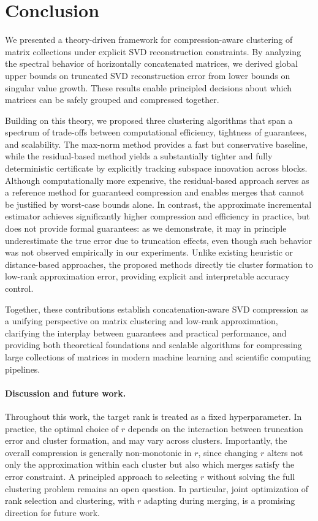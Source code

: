 \documentclass[10pt]{article} %
\begin{document}
\section{Conclusion}

We presented a theory-driven framework for compression-aware clustering of matrix collections under explicit SVD reconstruction constraints.
By analyzing the spectral behavior of horizontally concatenated matrices, we derived global upper bounds on truncated SVD reconstruction error from lower bounds on singular value growth.
These results enable principled decisions about which matrices can be safely grouped and compressed together.

Building on this theory, we proposed three clustering algorithms that span a spectrum of trade-offs between computational efficiency, tightness of guarantees, and scalability.
The max-norm method provides a fast but conservative baseline, while the residual-based method yields a substantially tighter and fully deterministic certificate by explicitly tracking subspace innovation across blocks.
Although computationally more expensive, the residual-based approach serves as a reference method for guaranteed compression and enables merges that cannot be justified by worst-case bounds alone.
In contrast, the approximate incremental estimator achieves significantly higher compression and efficiency in practice, but does not provide formal guarantees: as we demonstrate, it may in principle underestimate the true error due to truncation effects, even though such behavior was not observed empirically in our experiments.
Unlike existing heuristic or distance-based approaches, the proposed methods directly tie cluster formation to low-rank approximation error, providing explicit and interpretable accuracy control.

Together, these contributions establish concatenation-aware SVD compression as a unifying perspective on matrix clustering and low-rank approximation, clarifying the interplay between guarantees and practical performance, and providing both theoretical foundations and scalable algorithms for compressing large collections of matrices in modern machine learning and scientific computing pipelines.


\paragraph{Discussion and future work.}

Throughout this work, the target rank is treated as a fixed hyperparameter.
In practice, the optimal choice of \( r \) depends on the interaction between truncation error and cluster formation, and may vary across clusters.
Importantly, the overall compression is generally non-monotonic in \( r \), since changing \( r \) alters not only the approximation within each cluster but also which merges satisfy the error constraint.
A principled approach to selecting \( r \) without solving the full clustering problem remains an open question.
In particular, joint optimization of rank selection and clustering, with \( r \) adapting during merging, is a promising direction for future work.
\end{document}
